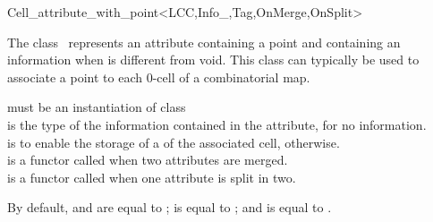 \ccRefPageBegin
\begin{ccRefClass}{Cell_attribute_with_point<LCC,Info_,Tag,OnMerge,OnSplit>}


\ccDefinition
  
The class \ccRefName\ represents an attribute containing a point and
containing an information when  is different from void.
This class can typically be used to associate a point to each 0-cell
of a combinatorial map. 


\ccIsModel
{}

\ccInheritsFrom
{} %

\ccParameters
{} must be an instantiation of  class\\
 is the type of the information contained in the attribute,  for no information. \\
 is  to enable the storage of a
    of the associated cell,  otherwise.\\
 is a functor called when two attributes are merged.  \\
 is a functor called when one attribute is split in two. 

   By default,  and  are equal to
   ;  is equal to
   ; and  is equal to .

\ccTypes
{}
%
{}
\ccGlue
%
\ccGlue
{}


\end{ccRefClass}
